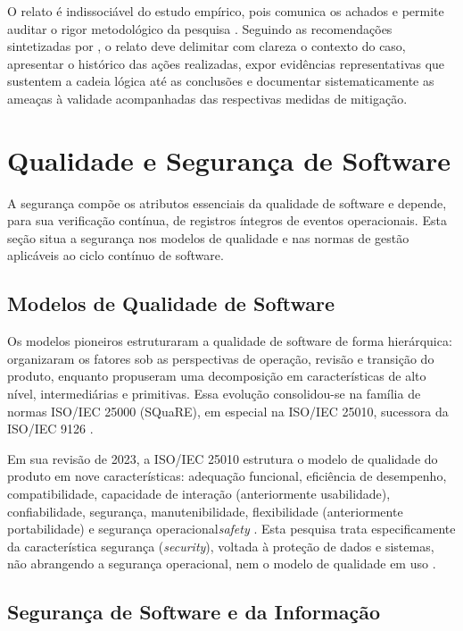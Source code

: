 O relato é indissociável do estudo empírico, pois comunica os achados e permite auditar o rigor metodológico da pesquisa \cite{runeson2009}. Seguindo as recomendações sintetizadas por , o relato deve delimitar com clareza o contexto do caso, apresentar o histórico das ações realizadas, expor evidências representativas que sustentem a cadeia lógica até as conclusões e documentar sistematicamente as ameaças à validade acompanhadas das respectivas medidas de mitigação.

\section{Qualidade e Segurança de Software}
\label{sec:ref_qualidade_seguranca}

A segurança compõe os atributos essenciais da qualidade de software e depende, para sua verificação contínua, de registros íntegros de eventos operacionais. Esta seção situa a segurança nos modelos de qualidade e nas normas de gestão aplicáveis ao ciclo contínuo de software.

\subsection{Modelos de Qualidade de Software}
\label{subsec:ref_modelos_qualidade}

Os modelos pioneiros estruturaram a qualidade de software de forma hierárquica:  organizaram os fatores sob as perspectivas de operação, revisão e transição do produto, enquanto  propuseram uma decomposição em características de alto nível, intermediárias e primitivas. Essa evolução consolidou-se na família de normas ISO/IEC 25000 (SQuaRE), em especial na ISO/IEC 25010, sucessora da ISO/IEC 9126 \cite{iso25010_2023}.

Em sua revisão de 2023, a ISO/IEC 25010 estrutura o modelo de qualidade do produto em nove características: adequação funcional, eficiência de desempenho, compatibilidade, capacidade de interação (anteriormente usabilidade), confiabilidade, segurança, manutenibilidade, flexibilidade (anteriormente portabilidade) e segurança operacional\textit{safety} \cite{iso25010_2023}. Esta pesquisa trata especificamente da característica segurança (\textit{security}), voltada à proteção de dados e sistemas, não abrangendo a segurança operacional, nem o modelo de qualidade em uso \cite{iso25010_2023}.

\subsection{Segurança de Software e da Informação}
\label{subsec:ref_seguranca_software}

